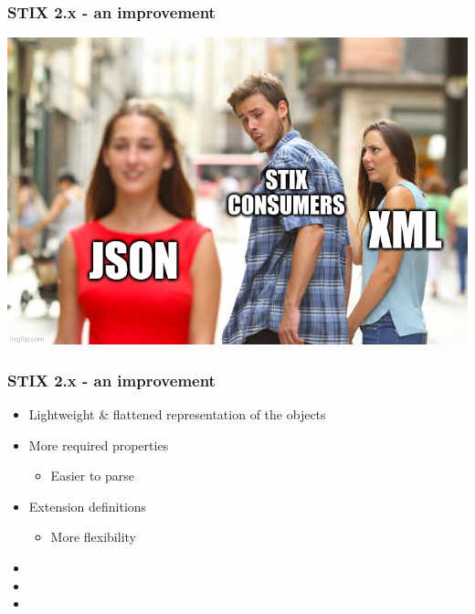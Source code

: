 \begin{frame}
    \frametitle{STIX 2.x - an improvement}
    \centering
    \includegraphics[scale=0.45]{images/json.jpg}
\end{frame}

\begin{frame}
    \frametitle{STIX 2.x - an improvement}
    \begin{itemize}
        \item Lightweight \& flattened representation of the objects
        \item More required properties
        \begin{itemize}
            \item Easier to parse
        \end{itemize}
        \item Extension definitions
        \begin{itemize}
            \item More flexibility
        \end{itemize}
        \item []
        \item []\hspace{1em} \linebreak \hspace{1em}  \linebreak \hspace{1em}
        \item []\hspace{1em} \linebreak \hspace{1em}  \linebreak \hspace{1em}
    \end{itemize}
\end{frame}

